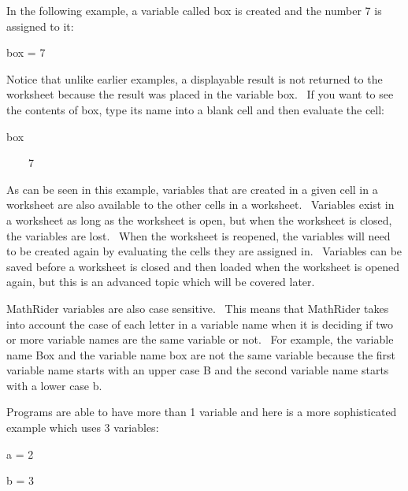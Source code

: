 \documentclass[12pt,twoside]{book}
\begin{document}
\bigskip

In the following example, a variable called box is created and the
number 7 is assigned to it:


\bigskip

box = 7

{\textbar}


\bigskip

Notice that unlike earlier examples, a displayable result is not
returned to the worksheet because the result was placed in the variable
box. \ If you want to see the contents of box, type its name into a
blank cell and then evaluate the cell:


\bigskip

box

{\textbar}

\ \ \ \ 7


\bigskip

As can be seen in this example, variables that are created in a given
cell in a worksheet are also available to the other cells in a
worksheet. \ Variables exist in a worksheet as long as the worksheet is
open, but when the worksheet is closed, the variables are lost. \ When
the worksheet is reopened, the variables will need to be created again
by evaluating the cells they are assigned in. \ Variables can be saved
before a worksheet is closed and then loaded when the worksheet is
opened again, but this is an advanced topic which will be covered
later.


\bigskip

MathRider variables are also case sensitive. \ This means that MathRider
takes into account the case of each letter in a variable name when it
is deciding if two or more variable names are the same variable or not.
\ For example, the variable name Box and the variable name box are not
the same variable because the first variable name starts with an upper
case {\textquotesingle}B{\textquotesingle} and the second variable name
starts with a lower case {\textquotesingle}b{\textquotesingle}.


\bigskip

Programs are able to have more than 1 variable and here is a more
sophisticated example which uses 3 variables:


\bigskip

a = 2

{\textbar}


\bigskip

b = 3

{\textbar}
\end{document}

